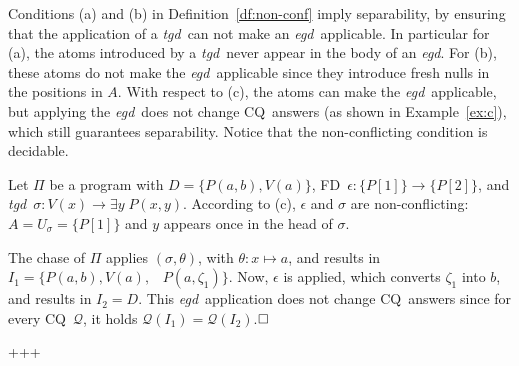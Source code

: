 \documentclass[format=acmsmall, review=false, screen=true]{acmart}
\newcommand{\cq}{CQ}
\newcommand{\boxtheorem}{\ensuremath{\hfill \Box}}
\newcommand{\mc}[1]{\mathcal{ #1}}
\newcommand{\prg}{\Pi}
\newcommand{\fd}{FD}
\newcommand{\egd}{{\em egd}}
\newcommand{\tgd}{{\em tgd}}
\begin{document}
{Conditions (a) and (b) in Definition~\ref{df:non-conf} imply separability, by ensuring that the application of a \tgd \ can not make an \egd \ applicable. In particular for (a), the atoms introduced by a \tgd \ never appear in the body of an \egd. For (b), these atoms do not make the \egd \ applicable since they introduce fresh nulls in the positions in $A$. With respect to (c), the atoms can make the \egd \ applicable, but applying the \egd \ does not change \cq \ answers (as shown in Example~\ref{ex:c}), which still guarantees separability. Notice that the non-conflicting condition is decidable.

\begin{example} \label{ex:c}Let $\prg$ be a program with $D=\{P(a,b),V(a)\}$, \fd \ $\epsilon: \{P[1]\}\rightarrow \{P[2]\}$, and \tgd \ $\sigma: V(x) \rightarrow \exists y\;P(x,y)$. According to (c), $\epsilon$ and $\sigma$ are non-conflicting: $A=U_{\sigma}=\{P[1]\}$ and $y$ appears once in the head of $\sigma$.

The chase of $\prg$ applies $(\sigma,\theta)$, with $\theta: x \mapsto a$, and results in $I_1=\{P(a,b),V(a),$ \ $P(a,\zeta_1)\}$. Now, $\epsilon$ is applied, which converts $\zeta_1$ into $b$, and results in $I_2=D$. This \egd \ application does not change \cq \ answers since for every \cq \ $\mc{Q}$, it holds $\mc{Q}(I_1)=\mc{Q}(I_2)$.\boxtheorem\end{example}

+++}
\end{document}
